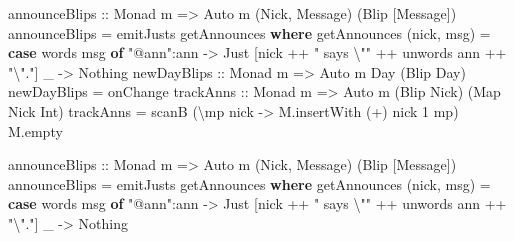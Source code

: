 \documentclass[]{article}
\newenvironment{Shaded}{}{}
\newcommand{\KeywordTok}[1]{\textcolor[rgb]{0.00,0.44,0.13}{\textbf{{#1}}}}
\newcommand{\DataTypeTok}[1]{\textcolor[rgb]{0.56,0.13,0.00}{{#1}}}
\newcommand{\DecValTok}[1]{\textcolor[rgb]{0.25,0.63,0.44}{{#1}}}
\newcommand{\StringTok}[1]{\textcolor[rgb]{0.25,0.44,0.63}{{#1}}}
\newcommand{\OtherTok}[1]{\textcolor[rgb]{0.00,0.44,0.13}{{#1}}}
\newcommand{\FunctionTok}[1]{\textcolor[rgb]{0.02,0.16,0.49}{{#1}}}
\newcommand{\NormalTok}[1]{{#1}}
\begin{document}
\begin{Shaded}
\begin{Highlighting}[]
\OtherTok{    announceBlips ::} \DataTypeTok{Monad} \NormalTok{m }\OtherTok{=>} \DataTypeTok{Auto} \NormalTok{m (}\DataTypeTok{Nick}\NormalTok{, }\DataTypeTok{Message}\NormalTok{) (}\DataTypeTok{Blip} \NormalTok{[}\DataTypeTok{Message}\NormalTok{])}
    \NormalTok{announceBlips }\FunctionTok{=} \NormalTok{emitJusts getAnnounces}
      \KeywordTok{where}
        \NormalTok{getAnnounces (nick, msg) }\FunctionTok{=}
          \KeywordTok{case} \NormalTok{words msg }\KeywordTok{of}
            \StringTok{"@ann"}\FunctionTok{:}\NormalTok{ann }\OtherTok{->} \DataTypeTok{Just} \NormalTok{[nick }\FunctionTok{++} \StringTok{" says \textbackslash{}""} \FunctionTok{++} \NormalTok{unwords ann }\FunctionTok{++} \StringTok{"\textbackslash{}"."}\NormalTok{]}
            \NormalTok{_          }\OtherTok{->} \DataTypeTok{Nothing}
\OtherTok{    newDayBlips ::} \DataTypeTok{Monad} \NormalTok{m }\OtherTok{=>} \DataTypeTok{Auto} \NormalTok{m }\DataTypeTok{Day} \NormalTok{(}\DataTypeTok{Blip} \DataTypeTok{Day}\NormalTok{)}
    \NormalTok{newDayBlips }\FunctionTok{=} \NormalTok{onChange}
\OtherTok{    trackAnns ::} \DataTypeTok{Monad} \NormalTok{m }\OtherTok{=>} \DataTypeTok{Auto} \NormalTok{m (}\DataTypeTok{Blip} \DataTypeTok{Nick}\NormalTok{) (}\DataTypeTok{Map} \DataTypeTok{Nick} \DataTypeTok{Int}\NormalTok{)}
    \NormalTok{trackAnns }\FunctionTok{=} \NormalTok{scanB (\textbackslash{}mp nick }\OtherTok{->} \NormalTok{M.insertWith (}\FunctionTok{+}\NormalTok{) nick }\DecValTok{1} \NormalTok{mp) M.empty}



\OtherTok{announceBlips ::} \DataTypeTok{Monad} \NormalTok{m }\OtherTok{=>} \DataTypeTok{Auto} \NormalTok{m (}\DataTypeTok{Nick}\NormalTok{, }\DataTypeTok{Message}\NormalTok{) (}\DataTypeTok{Blip} \NormalTok{[}\DataTypeTok{Message}\NormalTok{])}
\NormalTok{announceBlips }\FunctionTok{=} \NormalTok{emitJusts getAnnounces}
  \KeywordTok{where}
    \NormalTok{getAnnounces (nick, msg) }\FunctionTok{=}
      \KeywordTok{case} \NormalTok{words msg }\KeywordTok{of}
        \StringTok{"@ann"}\FunctionTok{:}\NormalTok{ann }\OtherTok{->} \DataTypeTok{Just} \NormalTok{[nick }\FunctionTok{++} \StringTok{" says \textbackslash{}""} \FunctionTok{++} \NormalTok{unwords ann }\FunctionTok{++} \StringTok{"\textbackslash{}"."}\NormalTok{]}
        \NormalTok{_          }\OtherTok{->} \DataTypeTok{Nothing}
\end{Highlighting}
\end{Shaded}
\end{document}
